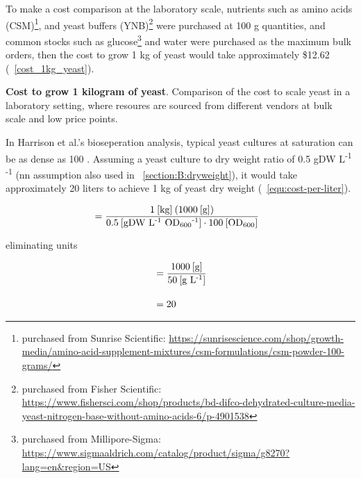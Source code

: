 \documentclass[../main/main]{subfiles}
\begin{document}
To make a cost comparison at the laboratory scale, nutrients such as amino acids (CSM)\footnote{
  purchased from Sunrise Scientific: \url{https://sunrisescience.com/shop/growth-media/amino-acid-supplement-mixtures/csm-formulations/csm-powder-100-grams/}
}, and yeast buffers (YNB)\footnote{
  purchased from Fisher Scientific: \url{https://www.fishersci.com/shop/products/bd-difco-dehydrated-culture-media-yeast-nitrogen-base-without-amino-acids-6/p-4901538}
} were purchased at 100 g quantities, and common stocks such as glucose\footnote{
  purchased from Millipore-Sigma: \url{https://www.sigmaaldrich.com/catalog/product/sigma/g8270?lang=en&region=US}
} and water were purchased as the maximum bulk orders, then the cost to grow 1 kg of yeast would take approximately \$12.62 (\TABLE~\ref{cost_1kg_yeast}).

\begin{table}[H]
  \centering
  \small
  
  \caption[Cost to grow 1 kilogram of yeast]{
    \textbf{Cost to grow 1 kilogram of yeast}.
    Comparison of the cost to scale yeast in a laboratory setting, where resoures are sourced from different vendors at bulk scale and low price points.
  }
  \label{cost_1kg_yeast}
\end{table}

In Harrison et al.'s bioseperation analysis, typical yeast cultures at saturation can be as dense as 100 \OD. Assuming a yeast culture to dry weight ratio of 0.5 gDW L\textsuperscript{-1} \OD\textsuperscript{-1} (nn assumption also used in \SECTION~\ref{section:B:dryweight}), it would take approximately 20 liters to achieve 1 kg of yeast dry weight (\EQUATION~\ref{equ:cost-per-liter}).

\begin{align}
  &=
  \dfrac
    {1\:[\text{kg}]\: (1000\:[\text{g}])}
    {0.5\:[\text{gDW L\textsuperscript{-1} OD\textsubscript{600}\textsuperscript{-1}}]
      \cdot
      100\:[\text{OD\textsubscript{600}}]}
\end{align}

eliminating units

\begin{align}
  &=
  \dfrac
    {1000\:[\text{g}]}
    {50\:[\text{g L\textsuperscript{-1}}]}
    \label{equ:cost-per-liter}
  \\[1em]
  &= 20
    \tagaddtext{[\si{\liter}]}
    \nonumber
\end{align}
\end{document}
